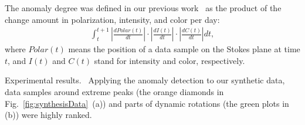 The anomaly degree was defined in our previous work~\cite{Sawada2018} as the product of the change amount in polarization, intensity, and color per day:
\begin{equation*}
\begin{split}
  \int_t^{t + 1}\left|\frac{dPolar(t)}{dt}\right|\cdot\left|\frac{dI(t)}{dt}\right|\cdot\left|\frac{dC(t)}{dt}\right|dt,
  \label{eq:anomaly}
\end{split}
\end{equation*}
where $Polar(t)$ means the position of a data sample on the Stokes plane at time $t$, and $I(t)$ and $C(t)$ stand for intensity and color, respectively. 

\textsf{Experimental results.\ } Applying the anomaly detection to our synthetic data, 
data samples around extreme peaks (the orange diamonds in Fig.~\ref{fig:synthesisData}~(a)) and parts of dynamic rotations (the green plots in (b)) were highly ranked.


